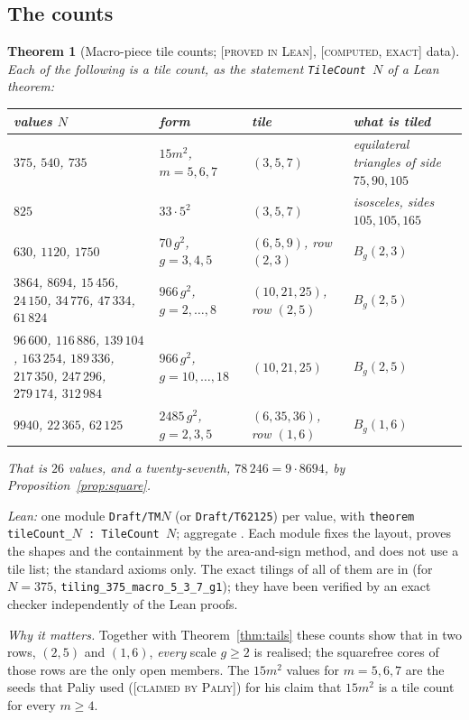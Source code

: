 \documentclass[11pt,reqno]{amsart}
\theoremstyle{plain}
\newtheorem{theorem}{Theorem}[section]
\theoremstyle{definition}
\newcommand{\lab}[1]{\textup{[\textsc{#1}]}}
\newcommand{\PL}{\lab{proved in Lean}}
\newcommand{\CE}{\lab{computed, exact}}
\newcommand{\CP}{\lab{claimed by Paliy}}
\newcommand{\why}[1]{\par\smallskip\noindent\emph{Why it matters.} #1\par}
\begin{document}
\subsection{The counts}
\begin{theorem}[Macro-piece tile counts; \PL{}, \CE{} data]\label{thm:macro}
Each of the following is a tile count, as the statement \texttt{TileCount $N$} of a Lean theorem:
\begin{center}\small
\begin{tabular}{@{}p{4.3cm}p{2.5cm}p{2.5cm}p{3.1cm}@{}}
\toprule
values $N$ & form & tile & what is tiled\\
\midrule
$375$, $540$, $735$ & $15m^2$, $m=5,6,7$ & $(3,5,7)$ & equilateral triangles of side $75,90,105$\\
$825$ & $33\cdot5^2$ & $(3,5,7)$ & isosceles, sides $105,105,165$\\
$630$, $1120$, $1750$ & $70\,g^2$, $g=3,4,5$ & $(6,5,9)$, row $(2,3)$ & $B_g(2,3)$\\
$3864$, $8694$, $15\,456$, $24\,150$, $34\,776$, $47\,334$, $61\,824$ & $966\,g^2$, $g=2,\dots,8$ & $(10,21,25)$, row $(2,5)$ & $B_g(2,5)$\\
$96\,600$, $116\,886$, $139\,104$, $163\,254$, $189\,336$, $217\,350$, $247\,296$, $279\,174$, $312\,984$ & $966\,g^2$, $g=10,\dots,18$ & $(10,21,25)$ & $B_g(2,5)$\\
$9940$, $22\,365$, $62\,125$ & $2485\,g^2$, $g=2,3,5$ & $(6,35,36)$, row $(1,6)$ & $B_g(1,6)$\\
\bottomrule
\end{tabular}
\end{center}
That is $26$ values, and a twenty-seventh, $78\,246=9\cdot8694$, by Proposition~\ref{prop:square}.
\end{theorem}
\emph{Lean:} one module \texttt{Draft/TM$N$} (or \texttt{Draft/T62125}) per value, with \texttt{theorem tileCount\_$N$ : TileCount $N$}; aggregate . Each module fixes the layout, proves the shapes and the containment by the area-and-sign method, and does not use a tile list; the standard axioms only.
The exact tilings of all of them are in  (for $N=375$, \texttt{tiling\_375\_macro\_5\_3\_7\_g1}); they have been verified by an exact checker independently of the Lean proofs.
\why{Together with Theorem~\ref{thm:tails} these counts show that in two rows, $(2,5)$ and $(1,6)$, \emph{every} scale $g\ge2$ is realised; the squarefree cores of those rows are the only open members. The $15m^2$ values for $m=5,6,7$ are the seeds that Paliy used (\CP{}) for his claim that $15m^2$ is a tile count for every $m\ge4$.}
\end{document}

